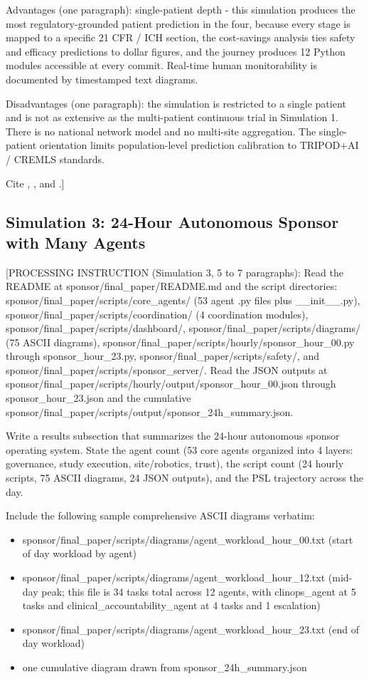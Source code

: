 Advantages (one paragraph): single-patient depth - this simulation
produces the most regulatory-grounded patient prediction in the four,
because every stage is mapped to a specific 21 CFR / ICH section, the
cost-savings analysis ties safety and efficacy predictions to dollar
figures, and the journey produces 12 Python modules accessible at every
commit. Real-time human monitorability is documented by timestamped text
diagrams.

Disadvantages (one paragraph): the simulation is restricted to a single
patient and is not as extensive as the multi-patient continuous trial in
Simulation 1. There is no national network model and no multi-site
aggregation. The single-patient orientation limits population-level
prediction calibration to TRIPOD+AI / CREMLS standards.

Cite \cite{kawchak_2026_19119939}, \cite{Collins2024TRIPODAI}, and
\cite{ElEmam2024CREMLS}.]

\subsection{Simulation 3: 24-Hour Autonomous Sponsor with Many Agents}
\label{sec:results-sim3}

[PROCESSING INSTRUCTION (Simulation 3, 5 to 7 paragraphs): Read the
README at sponsor/final\_paper/README.md and the script directories:
sponsor/final\_paper/scripts/core\_agents/ (53 agent .py files plus
\_\_init\_\_.py), sponsor/final\_paper/scripts/coordination/ (4
coordination modules), sponsor/final\_paper/scripts/dashboard/,
sponsor/final\_paper/scripts/diagrams/ (75 ASCII diagrams),
sponsor/final\_paper/scripts/hourly/sponsor\_hour\_00.py through
sponsor\_hour\_23.py, sponsor/final\_paper/scripts/safety/, and
sponsor/final\_paper/scripts/sponsor\_server/. Read the JSON outputs at
sponsor/final\_paper/scripts/hourly/output/sponsor\_hour\_00.json through
sponsor\_hour\_23.json and the cumulative
sponsor/final\_paper/scripts/output/sponsor\_24h\_summary.json.

Write a results subsection that summarizes the 24-hour autonomous sponsor
operating system. State the agent count (53 core agents organized into 4
layers: governance, study execution, site/robotics, trust), the script
count (24 hourly scripts, 75 ASCII diagrams, 24 JSON outputs), and the
PSL trajectory across the day.

Include the following sample comprehensive ASCII diagrams verbatim:
\begin{itemize}[leftmargin=*]
\item sponsor/final\_paper/scripts/diagrams/agent\_workload\_hour\_00.txt
(start of day workload by agent)
\item sponsor/final\_paper/scripts/diagrams/agent\_workload\_hour\_12.txt
(mid-day peak; this file is 34 tasks total across 12 agents, with
clinops\_agent at 5 tasks and clinical\_accountability\_agent at 4 tasks
and 1 escalation)
\item sponsor/final\_paper/scripts/diagrams/agent\_workload\_hour\_23.txt
(end of day workload)
\item one cumulative diagram drawn from sponsor\_24h\_summary.json
\end{itemize}

